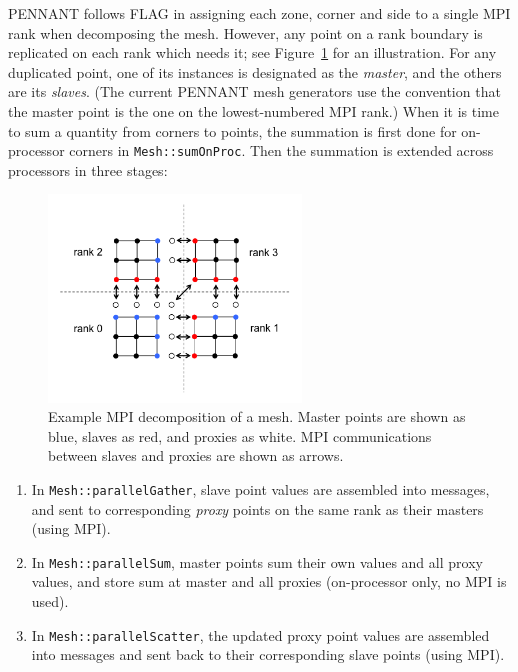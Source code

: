 \documentclass[11pt,letterpaper]{article}
\begin{document}
PENNANT follows FLAG in assigning each zone, corner and side to
a single MPI rank when decomposing the mesh.  However, any point on
a rank boundary is replicated on each rank which needs it; see
Figure~\ref{fig:decomp} for an illustration.  For any duplicated
point, one of its instances is designated as the {\em master}, and
the others are its {\em slaves}.  (The current PENNANT mesh generators
use the convention that the master point is the one on the
lowest-numbered MPI rank.)  When it is time to sum a quantity
from corners to points, the summation is first done for on-processor
corners in {\tt Mesh::sumOnProc}.  Then the summation is extended across
processors in three stages:

\begin{figure}
    \centering
    \includegraphics[width=0.6\textwidth]{domain-decomp.png}
    \caption{Example MPI decomposition of a mesh.  Master points are
        shown as blue, slaves as red, and proxies as white.
        MPI communications between slaves and proxies are shown
        as arrows.}
    \label{fig:decomp}
\end{figure}

\begin{enumerate}
    \item In {\tt Mesh::parallelGather},
        slave point values are assembled into messages, and sent
        to corresponding {\em proxy} points on the same rank as
        their masters (using MPI).
    \item In {\tt Mesh::parallelSum},
        master points sum their own values and all proxy values, and
        store sum at master and all proxies (on-processor only, no MPI
        is used).
    \item In {\tt Mesh::parallelScatter},
        the updated proxy point values are assembled into messages
        and sent back to their corresponding slave points (using MPI).
\end{enumerate}
\end{document}
